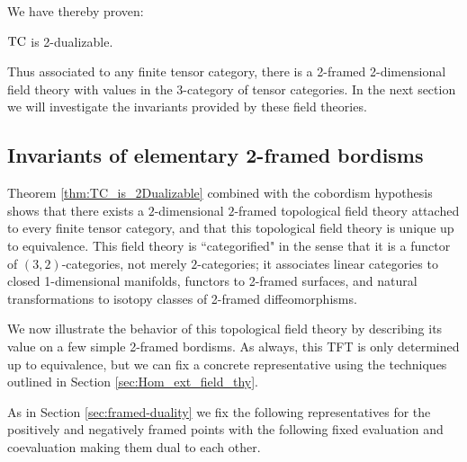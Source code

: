 \documentclass{amsart}
\begin{document}
We have thereby proven:
\begin{maintheorem} \label{thm:TC_is_2Dualizable}
	$\mathrm{TC}$ is 2-dualizable. 
\end{maintheorem}

\nid Thus associated to any finite tensor category, there is a 2-framed 2-dimensional field theory with values in the 3-category of tensor categories.  In the next section we will investigate the invariants provided by these field theories.

\subsection{Invariants of elementary 2-framed bordisms}
Theorem \ref{thm:TC_is_2Dualizable} combined with the cobordism hypothesis shows that there exists a $2$-dimensional $2$-framed topological field theory attached to every finite tensor category, and that this topological field theory is unique up to equivalence.  This field theory is ``categorified" in the sense that it is a functor of $(3,2)$-categories, not merely $2$-categories; it associates linear categories to closed 1-dimensional manifolds, functors to 2-framed surfaces, and natural transformations to isotopy classes of 2-framed diffeomorphisms. 

We now illustrate the behavior of this topological field theory by describing its value on a few simple 2-framed bordisms.  As always, this TFT is only determined up to equivalence, but we can fix a concrete representative using the techniques outlined in Section \ref{sec:Hom_ext_field_thy}.


As in Section \ref{sec:framed-duality} we fix the following representatives for the positively and negatively framed points with the following fixed evaluation and coevaluation making them dual to each other.
\end{document}
